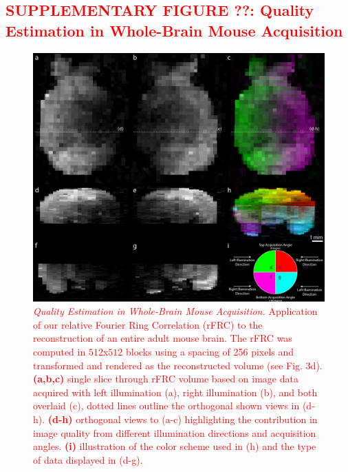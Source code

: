 \documentclass[]{spie}  %
\def\red{\textcolor{red}}
\begin{document}
\subsection*{\red{SUPPLEMENTARY FIGURE ??: Quality Estimation in Whole-Brain Mouse Acquisition}}
\vspace{1mm}
\begin{figure}[h!]
\includegraphics[width=\textwidth]{rFRC_brain.jpg}
\vspace{-2.0mm}
\caption{\hspace{-0.5mm} \red{\emph{Quality Estimation in Whole-Brain Mouse Acquisition.} Application of our relative Fourier Ring Correlation (rFRC) to the reconstruction of an entire adult mouse brain. The rFRC was computed in $512$x$512$ blocks using a spacing of 256 pixels and transformed and rendered as the reconstructed volume (see Fig. 3d). \textbf{(a,b,c)} single slice through rFRC volume based on image data acquired with left illumination (a), right illumination (b), and both overlaid (c), dotted lines outline the orthogonal shown views in (d-h). \textbf{(d-h)} orthogonal views to (a-c) highlighting the contribution in image quality from different illumination directions and acquisition angles. \textbf{(i)} illustration of the color scheme used in (h) and the type of data displayed in (d-g).
}}
\label{fig:sup-rfrc-brain}
\end{figure}

\pagebreak
\end{document}
